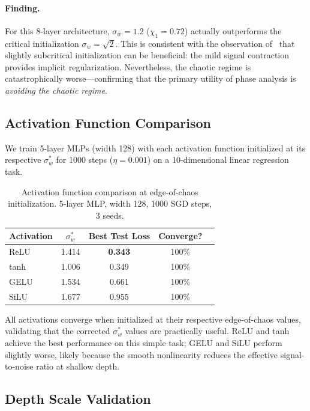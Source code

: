 \documentclass[10pt]{article}
\theoremstyle{definition}
\begin{document}
\paragraph{Finding.}
For this 8-layer architecture, $\sigma_w = 1.2$ ($\chi_1 = 0.72$) actually outperforms the critical initialization $\sigma_w = \sqrt{2}$.
This is consistent with the observation of~\citet{hayou2019impact} that slightly subcritical initialization can be beneficial: the mild signal contraction provides implicit regularization.
Nevertheless, the chaotic regime is catastrophically worse---confirming that the primary utility of phase analysis is \emph{avoiding the chaotic regime}.

\subsection{Activation Function Comparison}
\label{sec:activation-comparison}

We train 5-layer MLPs (width 128) with each activation function initialized at its respective $\sigma_w^*$ for 1000 steps ($\eta = 0.001$) on a 10-dimensional linear regression task.

\begin{table}[t]
\centering
\caption{Activation function comparison at edge-of-chaos initialization. 5-layer MLP, width 128, 1000 SGD steps, 3 seeds.}
\label{tab:activation-training}
\begin{tabular}{lcccc}
\toprule
Activation & $\sigma_w^*$ & Best Test Loss & Converge? \\
\midrule
ReLU & 1.414 & \textbf{0.343} & 100\% \\
tanh & 1.006 & 0.349 & 100\% \\
GELU & 1.534 & 0.661 & 100\% \\
SiLU & 1.677 & 0.955 & 100\% \\
\bottomrule
\end{tabular}
\end{table}

All activations converge when initialized at their respective edge-of-chaos values, validating that the corrected $\sigma_w^*$ values are practically useful.
ReLU and tanh achieve the best performance on this simple task; GELU and SiLU perform slightly worse, likely because the smooth nonlinearity reduces the effective signal-to-noise ratio at shallow depth.

\subsection{Depth Scale Validation}
\label{sec:depth-scale}
\end{document}
